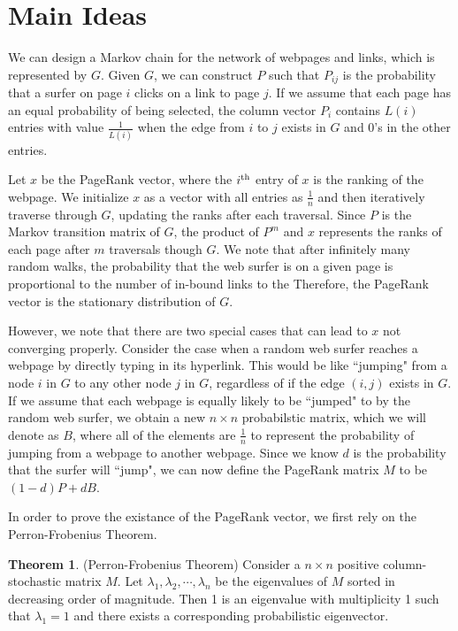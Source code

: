 \documentclass[11pt]{article}
\theoremstyle{definition}
\newtheorem{theorem}{Theorem}
\begin{document}
\section{Main Ideas}
We can design a Markov chain for the network of webpages and links, which is represented by $G$.
Given $G$, we can construct $P$ such that $P_{ij}$ is the probability that a surfer on page $i$ clicks on a link to page $j$. 
If we assume that each page has an equal probability of being selected, the column vector $P_i$ contains $L(i)$ entries with value $\frac{1}{L(i)}$ when the edge from $i$ to $j$ exists in $G$ and 0's in the other entries.

Let $x$ be the PageRank vector, where the $i^{\textnormal{th}}$ entry of $x$ is the ranking of the webpage.
We initialize $x$ as a vector with all entries as $\frac{1}{n}$ and then iteratively traverse through $G$, updating the ranks after each traversal.
Since $P$ is the Markov transition matrix of $G$, the product of $P^m$ and $x$ represents the ranks of each page after $m$ traversals though $G$.
We note that after infinitely many random walks, the probability that the web surfer is on a given page is proportional to the number of in-bound links to the 
Therefore, the PageRank vector is the stationary distribution of $G$.

However, we note that there are two special cases that can lead to $x$ not converging properly.
Consider the case when a random web surfer reaches a webpage by directly typing in its hyperlink. This would be like ``jumping" from a node $i$ in $G$ to any other node $j$ in $G$, regardless of if the edge $(i,j)$ exists in $G$.
If we assume that each webpage is equally likely to be ``jumped" to by the random web surfer, we obtain a new $n\times n$ probabilstic matrix, which we will denote as $B$, where all of the elements are $\frac{1}{n}$ to represent the probability of jumping from a webpage to another webpage. Since we know $d$ is the probability that the surfer will ``jump",  we can now define the PageRank matrix $M$ to be $(1-d)P + dB$.

In order to prove the existance of the PageRank vector, we first rely on the Perron-Frobenius Theorem.
\begin{theorem}
    (Perron-Frobenius Theorem) Consider a $n\times n$ positive column-stochastic matrix $M$. Let $\lambda_1, \lambda_2, \cdots, \lambda_n$ be the eigenvalues of $M$ sorted in decreasing order of magnitude. Then 1 is an eigenvalue with multiplicity 1 such that $\lambda_1=1$ and there exists a corresponding probabilistic eigenvector.
\end{theorem}
\end{document}
